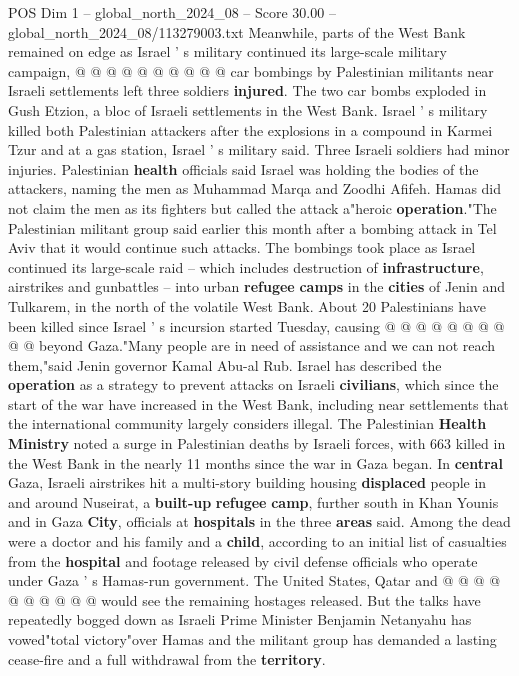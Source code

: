 \begin{textsample}{POS Dim 1 – global\_north\_2024\_08 – Score 30.00 – global\_north\_2024\_08/113279003.txt}
Meanwhile, parts of the West Bank remained on edge as Israel ' s military continued its large-scale military campaign, @ @ @ @ @ @ @ @ @ @ car bombings by Palestinian militants near Israeli settlements left three soldiers \textbf{injured}.
The two car bombs exploded in Gush Etzion, a bloc of Israeli settlements in the West Bank.
Israel ' s military killed both Palestinian attackers after the explosions in a compound in Karmei Tzur and at a gas station, Israel ' s military said.
Three Israeli soldiers had minor injuries.
Palestinian \textbf{health} officials said Israel was holding the bodies of the attackers, naming the men as Muhammad Marqa and Zoodhi Afifeh.
Hamas did not claim the men as its fighters but called the attack a"heroic \textbf{operation}."The Palestinian militant group said earlier this month after a bombing attack in Tel Aviv that it would continue such attacks.
The bombings took place as Israel continued its large-scale raid -- which includes destruction of \textbf{infrastructure}, airstrikes and gunbattles -- into urban \textbf{refugee} \textbf{camps} in the \textbf{cities} of Jenin and Tulkarem, in the north of the volatile West Bank.
About 20 Palestinians have been killed since Israel ' s incursion started Tuesday, causing @ @ @ @ @ @ @ @ @ @ beyond Gaza."Many people are in need of assistance and we can not reach them,"said Jenin governor Kamal Abu-al Rub.
Israel has described the \textbf{operation} as a strategy to prevent attacks on Israeli \textbf{civilians}, which since the start of the war have increased in the West Bank, including near settlements that the international community largely considers illegal.
The Palestinian \textbf{Health} \textbf{Ministry} noted a surge in Palestinian deaths by Israeli forces, with 663 killed in the West Bank in the nearly 11 months since the war in Gaza began.
In \textbf{central} Gaza, Israeli airstrikes hit a multi-story building housing \textbf{displaced} people in and around Nuseirat, a \textbf{built-up} \textbf{refugee} \textbf{camp}, further south in Khan Younis and in Gaza \textbf{City}, officials at \textbf{hospitals} in the three \textbf{areas} said.
Among the dead were a doctor and his family and a \textbf{child}, according to an initial list of casualties from the \textbf{hospital} and footage released by civil defense officials who operate under Gaza ' s Hamas-run government.
The United States, Qatar and @ @ @ @ @ @ @ @ @ @ would see the remaining hostages released.
But the talks have repeatedly bogged down as Israeli Prime Minister Benjamin Netanyahu has vowed"total victory"over Hamas and the militant group has demanded a lasting cease-fire and a full withdrawal from the \textbf{territory}.

\end{textsample}
